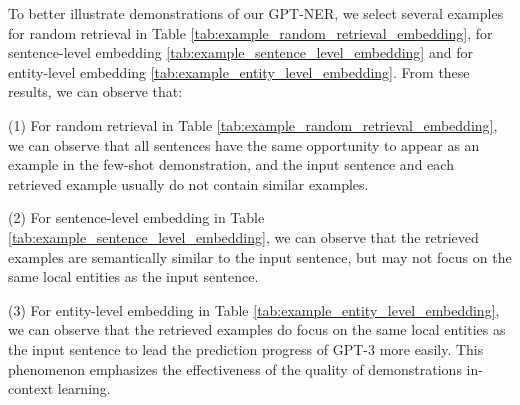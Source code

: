 \documentclass{article}
\begin{document}
To better illustrate demonstrations of our GPT-NER, we select several examples for random retrieval in Table \ref{tab:example_random_retrieval_embedding}, for sentence-level embedding \ref{tab:example_sentence_level_embedding} and for entity-level embedding \ref{tab:example_entity_level_embedding}. From these results, we can observe that:

(1) For random retrieval in Table \ref{tab:example_random_retrieval_embedding}, we can observe that all sentences have the same opportunity to appear as an example in the few-shot demonstration, and the input sentence and each retrieved example usually do not contain similar examples. 

(2) For sentence-level embedding in Table \ref{tab:example_sentence_level_embedding}, we can observe that the retrieved examples are semantically similar to the input sentence, but may not focus on the same local entities as the input sentence.

(3) For entity-level embedding in Table \ref{tab:example_entity_level_embedding}, we can observe that the retrieved examples do focus on the same local entities as the input sentence to lead the prediction progress of GPT-3 more easily. This phenomenon emphasizes the effectiveness of the quality of demonstrations in-context learning.
\end{document}
